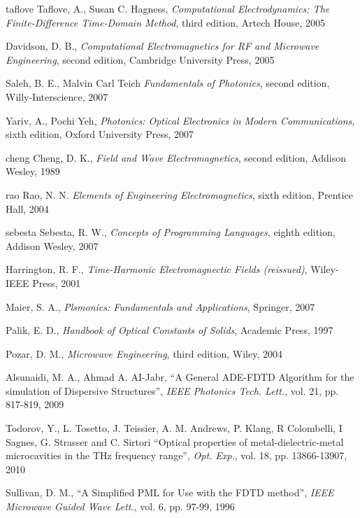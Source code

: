 \cleardoublepage
{}
\begin{thebibliography}{999}
  \bibitem
  {taflove}
  Taflove, A., Susan C. Hagness, 
  \textit{Computational Electrodynamics: The Finite-Difference Time-Domain Method}, third edition,
  Artech House,
  2005
 
  \bibitem
  {}
  Davidson, D. B.,
  \textit{Computational Electromagnetics for RF and Microwave Engineering}, second edition,
  Cambridge University Press,
  2005

  \bibitem
  {}
  Saleh, B. E., Malvin Carl Teich
  \textit{Fundamentals of Photonics}, second edition,
  Willy-Interscience,
  2007

  \bibitem
  {}
  Yariv, A., Pochi Yeh,
  \textit{Photonics: Optical Electronics in Modern Communications}, sixth edition,
  Oxford University Press, 
  2007

  \bibitem
  {cheng}
  Cheng, D. K.,
  \textit{Field and Wave Electromagnetics}, second edition,
  Addison Wesley,
  1989

  \bibitem
  {rao} 
  Rao, N. N.
  \textit{Elements of Engineering Electromagnetics}, sixth edition,
  Prentice Hall,
  2004

  \bibitem
  {sebesta}
  Sebesta, R. W.,
  \textit{Concepts of Programming Languages}, eighth edition,
  Addison Wesley,
  2007

  \bibitem
  {}
  Harrington, R. F.,
  \textit{Time-Harmonic Electromagnectic Fields (reissued)},
  Wiley-IEEE Press,
  2001

  \bibitem
  {}
  Maier, S. A.,
  \textit{Plsmonics: Fundamentals and Applications},
  Springer,
  2007

  \bibitem
  {}
  Palik, E. D.,
  \textit{Handbook of Optical Constants of Solids},
  Academic Press,
  1997

  \bibitem
  {}
  Pozar, D. M.,
  \textit{Microwave Engineering}, third edition,
  Wiley,
  2004

  \bibitem
  {}
  Alsunaidi, M. A., Ahmad A. AI-Jabr,
  ``A General ADE-FDTD Algorithm for the simulation of Dispersive Structures'',
  \textit{IEEE Photonics Tech. Lett.},
  vol. 21,
  pp. 817-819,
  2009

  \bibitem
  {}
  Todorov, Y., L. Tosetto, J. Teissier, A. M. Andrews, P. Klang, R Colombelli, I Sagnes, G. Strasser and C. Sirtori
  ``Optical properties of metal-dielectric-metal microcavities in the THz frequency range'',
  \textit{Opt. Exp.},
  vol. 18,
  pp. 13866-13907,
  2010

  \bibitem
  {}
  Sullivan, D. M.,
  ``A Simplified PML for Use with the FDTD method'',
  \textit{IEEE Microwave Guided Wave Lett.},
  vol. 6,
  pp. 97-99,
  1996


\end{thebibliography}
